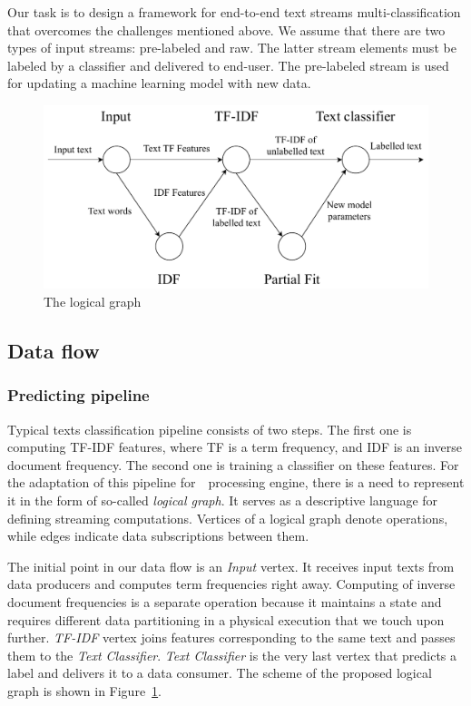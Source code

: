 \label{fs-framework}

Our task is to design a framework for end-to-end text streams multi-classification that overcomes the challenges mentioned above. We assume that there are two types of input streams: pre-labeled and raw. The latter stream elements must be labeled by a classifier and delivered to end-user. The pre-labeled stream is used for updating a machine learning model with new data.

\begin{figure}[htbp]
  \centering
  \includegraphics[scale=0.48]{pics/logical-graph}
  \caption{The logical graph}
  \label {logical_graph}
\end{figure}

\subsection{Data flow \label{DF}}

\subsubsection{Predicting pipeline}

Typical texts classification pipeline consists of two steps. The first one is computing TF-IDF features, where TF is a term frequency, and IDF is an inverse document frequency. The second one is training a classifier on these features. For the adaptation of this pipeline for~\FlameStream\ processing engine, there is a need to represent it in the form of so-called {\em logical graph}. It serves as a descriptive language for defining streaming computations. Vertices of a logical graph denote operations, while edges indicate data subscriptions between them. 

The initial point in our data flow is an {\em Input} vertex. It receives input texts from data producers and computes term frequencies right away. Computing of inverse document frequencies is a separate operation because it maintains a state and requires different data partitioning in a physical execution that we touch upon further. {\em TF-IDF} vertex joins features corresponding to the same text and passes them to the {\em Text Classifier}. {\em Text Classifier} is the very last vertex that predicts a label and delivers it to a data consumer. The scheme of the proposed logical graph is shown in Figure~\ref{logical_graph}.

